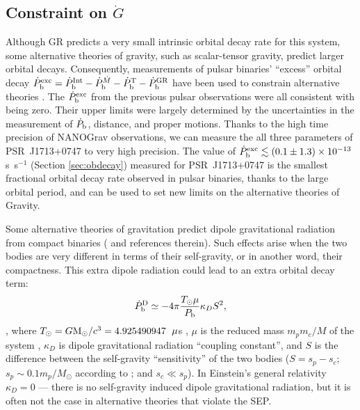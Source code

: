 \subsection{Constraint on $\dot{G}$}
\label{sec:Gdot}
Although GR predicts a very small intrinsic orbital decay rate for
this system,
some alternative theories of gravity, such as scalar-tensor gravity,
predict larger orbital decays.
Consequently, measurements of pulsar binaries' ``excess'' orbital decay
$\dot{P}_{\rm b}^{\rm exc}=\dot{P}_{\rm b}^{\rm Int} - \dot{P}_{\rm
b}^{\dot{M}}  - \dot{P}_{\rm b}^{\rm T} - \dot{P}_{\rm b}^{\rm GR}$ have been
used to constrain alternative theories \citep[e.g.][]{lwj+09, fwe+12}. 
The $\dot{P}_{\rm b}^{\rm exc}$ from the previous pulsar
observations were all consistent with being zero. Their upper limits were
largely determined by the uncertainties in the measurement of $\dot P_{\rm b}$,
distance, and proper motions.
Thanks to the high time precision of NANOGrav observations, we can measure the
all three parameters of PSR~J1713+0747 to very high precision. The
value of
$\dot{P}_{\rm b}^{\rm exc}\lesssim(0.1\pm1.3)\times10^{-13}$s~s$^{-1}$ (Section
\ref{sec:obdecay}) measured for PSR~J1713+0747 is
the smallest fractional orbital decay rate observed in pulsar binaries,
thanks to the large orbital period, and can be used to
set new limits on the alternative theories of Gravity.

Some alternative theories of gravitation predict dipole gravitational
radiation from compact binaries (\citealt{Will93, Will01, lwj+09,
  fwe+12} and references therein).  Such effects arise when the two bodies are very different in terms of their self-gravity, or in another word, their compactness.
This extra dipole radiation could lead to an extra orbital decay term:
\begin{equation}
\dot{P}_{\rm b}^{\rm D} \simeq -4\pi\frac{T_{\odot}\mu}{P_{\rm b}}\kappa_D S^2,
\end{equation}
\citep{lwj+09}, where $T_{\odot}=G{\rm M_{\odot}}/c^3=4.925490947$~${\rm
\mu}$s \citep{lk05}, $\mu$ is the reduced mass $m_pm_c/M$ of the system , $\kappa_D $ is dipole
gravitational radiation ``coupling constant'', and $S$ is the difference
between the self-gravity ``sensitivity'' of the two bodies ($S = s_p - s_c$;
$s_p\sim0.1m_p/M_{\odot}$ according to \citealt{de92} ; and $s_c\ll s_p$).
In Einstein's general relativity $\kappa_D=0$ --- there is no self-gravity induced
dipole gravitational radiation, but it is often not the case in alternative
theories that violate the SEP.

